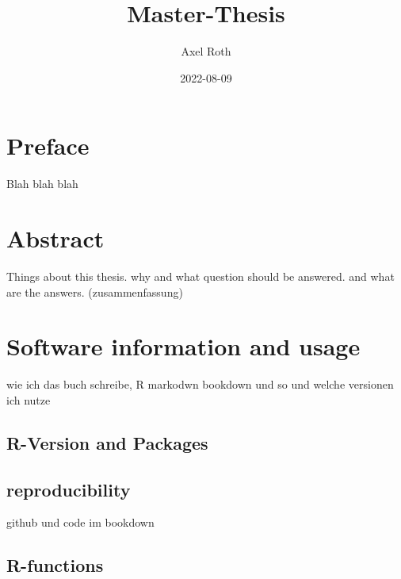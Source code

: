\documentclass[
  oneside]{book}
\title{Master-Thesis}
\author{Axel Roth}
\date{2022-08-09}
\begin{document}
\maketitle

{
\setcounter{tocdepth}{1}
\tableofcontents
}
\hypertarget{preface}{%
\chapter*{Preface}\label{preface}}

\renewcommand{\chaptermark}[1]{\markboth{\uppercase{#1}}{\uppercase{#1}}}

Blah blah blah

\renewcommand{\chaptermark}[1]{\markboth{\uppercase{\thechapter. \ #1}}{}}

\hypertarget{abstract}{%
\chapter{Abstract}\label{abstract}}

Things about this thesis. why and what question should be answered. and what are the answers. (zusammenfassung)

\hypertarget{software-information-and-usage}{%
\chapter{Software information and usage}\label{software-information-and-usage}}

wie ich das buch schreibe, R markodwn bookdown und so und welche versionen ich nutze

\hypertarget{r-version-and-packages}{%
\section{R-Version and Packages}\label{r-version-and-packages}}

\hypertarget{reproducibility}{%
\section{reproducibility}\label{reproducibility}}

github und code im bookdown

\hypertarget{r-functions}{%
\section{R-functions}\label{r-functions}}
\end{document}
